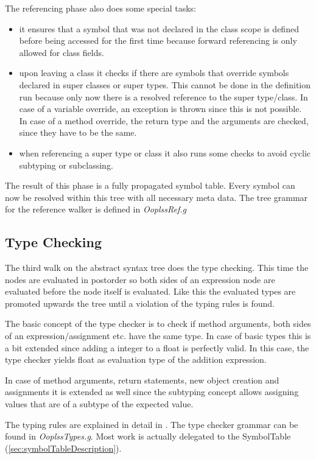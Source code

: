 \noindent The referencing phase also does some special tasks:
\begin{itemize}
\item it ensures that a symbol that was not declared in the class scope is
defined before being accessed for the first time because forward referencing
is only allowed for class fields.
\item upon leaving a class it checks if there are symbols that override symbols
declared in super classes or super types. This cannot be done in the definition
run because only now there is a resolved reference to the super type/class.
In case of a variable override, an exception is thrown since this is not
possible. In case of a method override, the return type and the arguments
are checked, since they have to be the same.
\item when referencing a super type or class it also runs some checks to avoid
cyclic subtyping or subclassing.
\end{itemize}

The result of this phase is a fully propagated symbol table. Every symbol can
now be resolved within this tree with all necessary meta data. The tree grammar
for the reference walker is defined in \emph{OoplssRef.g}

\subsection{Type Checking}
The third walk on the abstract syntax tree does the type checking. This
time the nodes are evaluated in postorder so both sides of an expression
node are evaluated before the node itself is evaluated. Like this the
evaluated types are promoted upwards the tree until a violation of the
typing rules is found.

The basic concept of the type checker is to check if method arguments,
both sides of an expression/assignment etc. have the same type. In case
of basic types this is a bit extended since adding a integer to a float
is perfectly valid. In this case, the type checker yields float as evaluation
type of the addition expression.

In case of method arguments, return statements, new object creation
and assignments it is extended as well since the subtyping concept
allows assigning values that are of a subtype of the expected value.

The typing rules are explained in detail in . The
type checker grammar can be found in \emph{OoplssTypes.g}. Most work
is actually delegated to the SymbolTable (\ref{sec:symbolTableDescription}).

